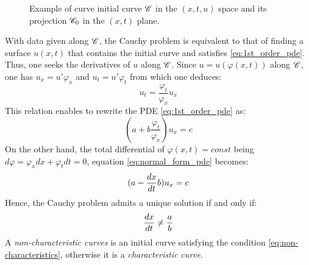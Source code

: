 \begin{figure}[h]
  \centering
  
  \caption{Example of curve initial curve $\mathscr{C}$ in the $(x,t,u)$ space and its projection $\mathscr{C}_0$ in the $(x,t)$ plane.}
  \label{fig:initial_curve}
\end{figure}
With data given along $\mathscr{C}$, the Cauchy problem is equivalent to that of finding a surface $u(x,t)$ that contains the initial curve and satisfies \eqref{eq:1st_order_pde}. Thus, one seeks the derivatives of $u$ along $\mathscr{C}$. Since $u=u(\varphi(x,t))$ along $\mathscr{C}$, one has $u_x = u' \varphi_x $ and $u_t = u' \varphi_t$ from which one deduces:
\begin{equation*}
  u_t = \frac{\varphi_t}{\varphi_x}u_x 
\end{equation*}
This relation enables to rewrite the PDE \eqref{eq:1st_order_pde} as:
\begin{equation}
  \label{eq:normal_form_pde}
  (a + b\frac{\varphi_t}{\varphi_x})u_x = c
\end{equation}
On the other hand, the total differential of $\varphi(x,t)=const$ being $d\varphi = \varphi_x dx + \varphi_t dt =0$, equation \eqref{eq:normal_form_pde} becomes:
\begin{equation}
  \label{eq:normal_form_pde_2}
  (a - \frac{d x}{d t}b)u_x = c
\end{equation}
Hence, the Cauchy problem admits a unique solution if and only if:
\begin{equation}
  \label{eq:non-characteristics}
  \frac{d x}{d t}\neq \frac{a}{b}
\end{equation}
A \textit{non-characteristic curves} is an initial curve satisfying the condition \eqref{eq:non-characteristics}, otherwise it is a \textit{characteristic curve}. 

